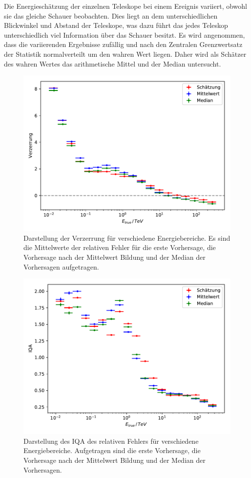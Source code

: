 Die Energieschätzung der einzelnen Teleskope bei einem Ereignis variiert, obwohl sie das gleiche Schauer beobachten.
Dies liegt an dem unterschiedlichen Blickwinkel und Abstand der Teleskope, was dazu führt das jedes Teleskop unterschiedlich viel Information über das
Schauer besitzt.
Es wird angenommen, dass die variierenden Ergebnisse zufällig und nach den Zentralen Grenzwertsatz der Statistik normalverteilt um den
wahren Wert liegen\cite[10]{zufall_Fehler}.
Daher wird als Schätzer des wahren Wertes das arithmetische Mittel und der Median untersucht.
\begin{figure}
  \includegraphics[width=\textwidth]{Plots/RF_mean_bias.pdf}
  \centering
  \caption{Darstellung der Verzerrung für verschiedene Energiebereiche. Es sind die Mittelwerte der relativen Fehler für die erste Vorhersage, die Vorhersage
          nach der Mittelwert Bildung und der Median der Vorhersagen aufgetragen.}
  \label{abb:mean_median_bias}
\end{figure}
\begin{figure}
  \includegraphics[width=\textwidth]{Plots/RF_mean_resolution.pdf}
  \centering
  \caption{Darstellung des IQA des relativen Fehlers für verschiedene Energiebereiche. Aufgetragen sind die erste Vorhersage, die Vorhersage
          nach der Mittelwert Bildung und der Median der Vorhersagen.}
  \label{abb:mean_median_IQA}
\end{figure}
